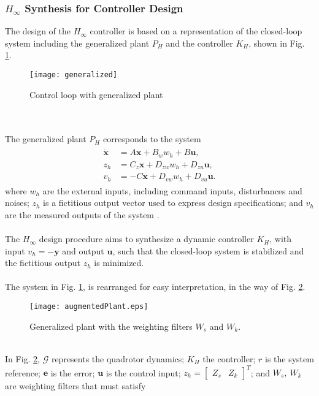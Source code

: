 \subsubsection{$H_\infty$ Synthesis for Controller Design}
The design of the $H_\infty$ controller is based on a representation of the closed-loop system including the generalized plant $P_H$ and the controller $K_H$, shown in Fig. \ref{fig:generalized}.
	\begin{figure}[h]
	\begin{center}
	\texttt{[image: generalized]}
	\caption{Control loop with generalized plant}
	\label{fig:generalized}
	\end{center}
	\end{figure}
\\\\The generalized plant $P_H$ corresponds to the system
\begin{align}
\begin{split}
\mathbf{\dot{x}} & = A\mathbf{x} + B_{w}w_{h} + B\mathbf{u},\\[5px]
z_{h} & = C_{z}\mathbf{x} + D_{zw}w_{h} + D_{zu}\mathbf{u},\\[5px]
v_{h} & = -C\mathbf{x} + D_{vw}w_{h} + D_{vu}\mathbf{u}.
\end{split}
\end{align} 
where $w_h$ are the external inputs, including command inputs, disturbances and noises; $z_h$ is a fictitious output vector used to express design specifications; and $v_h$ are the measured outputs of the system \cite{Werner2012}.
\\\\
The $H_\infty$ design procedure aims to synthesize a dynamic controller $K_H$, with input $v_h = -\mathbf{y}$ and output $\mathbf{u}$, such that the closed-loop system is stabilized and the fictitious output $z_h$ is minimized.
\\\\
The system in Fig. \ref{fig:generalized}, is rearranged for easy interpretation, in the way of Fig. \ref{fig:augmentedPlant}.
\begin{figure}[h]
	\begin{center}
	\texttt{[image: augmentedPlant.eps]}
	\caption{Generalized plant with the weighting filters $W_s$ and $W_k$.}
	\label{fig:augmentedPlant}
	\end{center}
	\end{figure}	
\\In Fig. \ref{fig:augmentedPlant}, $\mathcal{G}$ represents the quadrotor dynamics; $K_H$ the controller; $r$ is the system reference; $\mathbf{e}$ is the error; $\mathbf{u}$ is the control input; $z_{h} = \begin{bmatrix}
Z_s & Z_k
\end{bmatrix}^{T}$; and $W_{s},\ W_{k}$ are weighting filters that must satisfy 
